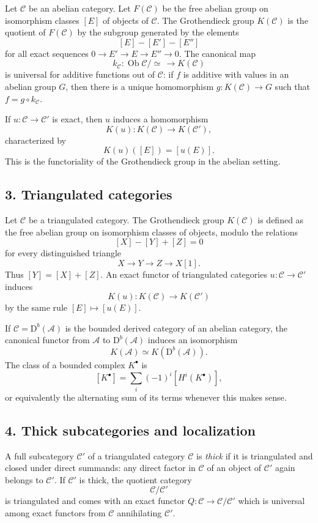 \documentclass[14pt]{extarticle}
\newcommand{\D}{\mathrm D}
\newcommand{\cA}{\mathcal A}
\newcommand{\cC}{\mathcal C}
\begin{document}
Let $\cC$ be an abelian category. Let $F(\cC)$ be the free abelian group on isomorphism classes $[E]$ of objects of $\cC$. The Grothendieck group $K(\cC)$ is the quotient of $F(\cC)$ by the subgroup generated by the elements
\[
   [E]-[E']-[E'']
\]
for all exact sequences $0\to E'\to E\to E''\to0$. The canonical map
\[
   k_\cC:\operatorname{Ob}\cC/\simeq\,\longrightarrow K(\cC)
\]
is universal for additive functions out of $\cC$: if $f$ is additive with values in an abelian group $G$, then there is a unique homomorphism $g:K(\cC)\to G$ such that $f=g\circ k_\cC$.

If $u:\cC\to\cC'$ is exact, then $u$ induces a homomorphism
\[
   K(u):K(\cC)\to K(\cC'),
\]
characterized by
\[
   K(u)([E])=[u(E)].
\]
This is the functoriality of the Grothendieck group in the abelian setting.

\subsection*{3. Triangulated categories}

Let $\cC$ be a triangulated category. The Grothendieck group $K(\cC)$ is defined as the free abelian group on isomorphism classes of objects, modulo the relations
\[
   [X]-[Y]+[Z]=0
\]
for every distinguished triangle
\[
   X\to Y\to Z\to X[1].
\]
Thus $[Y]=[X]+[Z]$. An exact functor of triangulated categories $u:\cC\to\cC'$ induces
\[
   K(u):K(\cC)\to K(\cC')
\]
by the same rule $[E]\mapsto [u(E)]$.

If $\cC=\D^b(\cA)$ is the bounded derived category of an abelian category, the canonical functor from $\cA$ to $\D^b(\cA)$ induces an isomorphism
\[
   K(\cA)\simeq K(\D^b(\cA)).
\]
The class of a bounded complex $K^\bullet$ is
\[
   [K^\bullet]=\sum_i(-1)^i[H^i(K^\bullet)],
\]
or equivalently the alternating sum of its terms whenever this makes sense.

\subsection*{4. Thick subcategories and localization}

A full subcategory $\cC'$ of a triangulated category $\cC$ is \emph{thick} if it is triangulated and closed under direct summands: any direct factor in $\cC$ of an object of $\cC'$ again belongs to $\cC'$. If $\cC'$ is thick, the quotient category
\[
   \cC/\cC'
\]
is triangulated and comes with an exact functor $Q:\cC\to\cC/\cC'$ which is universal among exact functors from $\cC$ annihilating $\cC'$.
\end{document}
